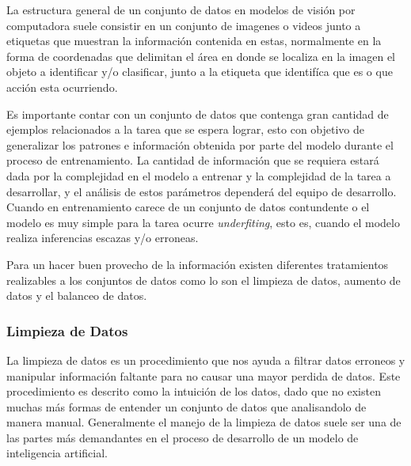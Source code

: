 \documentclass[letter,12pt]{report}
\begin{document}
La estructura general de un conjunto de datos en modelos de visión por computadora suele
consistir en un conjunto de imagenes o videos junto a etiquetas que muestran la
información contenida en estas, normalmente en la forma de coordenadas que delimitan el
área en donde se localiza en la imagen el objeto a identificar y/o clasificar, junto a la
etiqueta que identifíca que es o que acción esta ocurriendo.

Es importante contar con un conjunto de datos que contenga gran cantidad de ejemplos
relacionados a la tarea que se espera lograr, esto con objetivo de generalizar los
patrones e información obtenida por parte del modelo durante el proceso de entrenamiento.
La cantidad de información que se requiera estará dada por la complejidad en el modelo a
entrenar y la complejidad de la tarea a desarrollar, y el análisis de estos parámetros
dependerá del equipo de desarrollo. Cuando en entrenamiento carece de un conjunto de
datos contundente o el modelo es muy simple para la tarea ocurre \textit{underfiting},
esto es, cuando el modelo realiza inferencias escazas y/o erroneas.

Para un hacer buen provecho de la información existen diferentes tratamientos realizables
a los conjuntos de datos como lo son el limpieza de datos, aumento de datos y el balanceo
de datos.

\subsubsection{Limpieza de Datos}
La limpieza de datos es un procedimiento que nos ayuda a filtrar datos erroneos y
manipular información faltante para no causar una mayor perdida de datos. Este
procedimiento es descrito como la intuición de los datos, dado que no existen muchas más
formas de entender un conjunto de datos que analisandolo de manera manual. Generalmente
el manejo de la limpieza de datos suele ser una de las partes más demandantes en el
proceso de desarrollo de un modelo de inteligencia artificial.
\end{document}
